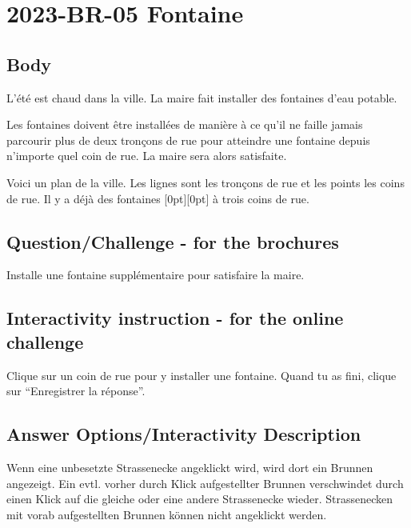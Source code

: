 \documentclass[a4paper,11pt]{report}
\newcommand{\taskGraphicsFolder}{..}
\begin{document}
\section*{\centering{} 2023-BR-05 Fontaine}


\subsection*{Body}

L’été est chaud dans la ville. La maire fait installer des fontaines d’eau potable.

Les fontaines doivent être installées de manière à ce qu’il ne faille jamais parcourir plus de deux tronçons de rue pour atteindre une fontaine depuis n’importe quel coin de rue. La maire sera alors satisfaite.

Voici un plan de la ville. Les lignes sont les tronçons de rue et les points les coins de rue. Il y a déjà des fontaines \raisebox{-0.5ex}[0pt][0pt]{} à trois coins de rue.

{\centering%
\par}

{\em


\subsection*{Question/Challenge - for the brochures}

Installe une fontaine supplémentaire pour satisfaire la maire.

}


\subsection*{Interactivity instruction - for the online challenge}

Clique sur un coin de rue pour y installer une fontaine. Quand tu as fini, clique sur “Enregistrer la réponse”.

\begingroup
\renewcommand{\arraystretch}{1.5}
\subsection*{Answer Options/Interactivity Description}

Wenn eine unbesetzte Strassenecke angeklickt wird, wird dort ein Brunnen angezeigt. Ein evtl. vorher durch Klick aufgestellter Brunnen verschwindet durch einen Klick auf die gleiche oder eine andere Strassenecke wieder. Strassenecken mit vorab aufgestellten Brunnen können nicht angeklickt werden.
\end{document}
